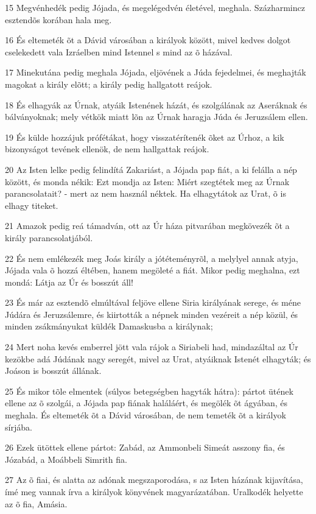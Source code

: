 \par 15 Megvénhedék pedig Jójada, és megelégedvén életével, meghala. Százharmincz esztendõs korában hala meg.
\par 16 És eltemeték õt a Dávid városában a királyok között, mivel kedves dolgot cselekedett vala Izráelben mind Istennel s mind az õ házával.
\par 17 Minekutána pedig meghala Jójada, eljövének a Júda fejedelmei, és meghajták magokat a király elõtt; a király pedig hallgatott reájok.
\par 18 És elhagyák az Úrnak, atyáik Istenének házát, és szolgálának az Aseráknak és bálványoknak; mely vétkök miatt lõn az Úrnak haragja Júda és Jeruzsálem ellen.
\par 19 És külde hozzájuk prófétákat, hogy visszatérítenék õket az Úrhoz, a kik bizonyságot tevének ellenök, de nem hallgattak reájok.
\par 20 Az Isten lelke pedig felindítá Zakariást, a Jójada pap fiát, a ki felálla a nép között, és monda nékik: Ezt mondja az Isten: Miért szegtétek meg az Úrnak parancsolatait? - mert az nem használ néktek. Ha elhagytátok az Urat, õ is elhagy titeket.
\par 21 Amazok pedig reá támadván, ott az Úr háza pitvarában megkövezék õt a király parancsolatjából.
\par 22 És nem emlékezék meg Joás király a jótéteményrõl, a melylyel annak atyja, Jójada vala õ hozzá éltében, hanem megöleté a fiát. Mikor pedig meghalna, ezt mondá: Látja az Úr és bosszút áll!
\par 23 És már az esztendõ elmúltával feljöve ellene Siria királyának serege, és méne Júdára és Jeruzsálemre, és kiirtották a népnek minden vezéreit a nép közül, és minden zsákmányukat küldék Damaskusba a királynak;
\par 24 Mert noha kevés emberrel jött vala rájok a Siriabeli had, mindazáltal az Úr kezökbe adá Júdának nagy seregét, mivel az Urat, atyáiknak Istenét elhagyták; és Joáson is bosszút állának.
\par 25 És mikor tõle elmentek (súlyos betegségben hagyták hátra): pártot ütének ellene az õ szolgái, a Jójada pap fiának haláláért, és megölék õt ágyában, és meghala. És eltemeték õt a Dávid városában, de nem temeték õt a királyok sírjába.
\par 26 Ezek ütöttek ellene pártot: Zabád, az Ammonbeli Simeát asszony fia, és Józabád, a Moábbeli Simrith fia.
\par 27 Az õ fiai, és alatta az adónak megszaporodása, s az Isten házának kijavítása, ímé meg vannak írva a királyok könyvének magyarázatában. Uralkodék helyette az õ fia, Amásia.

